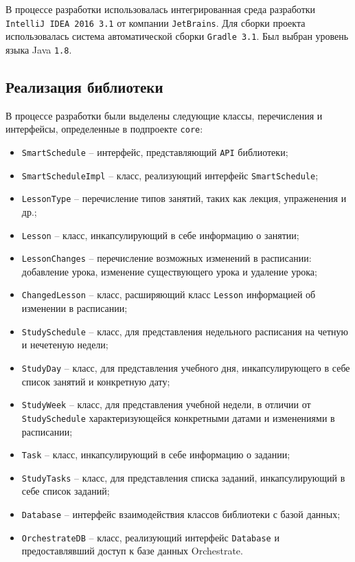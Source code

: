 В процессе разработки использовалась интегрированная среда разработки \texttt{IntelliJ IDEA 2016 3.1} от компании \texttt{JetBrains}. Для сборки проекта использовалась система автоматической сборки \texttt{Gradle 3.1}. Был выбран уровень языка Java \texttt{1.8}.

\subsection{Реализация библиотеки}
В процессе разработки были выделены следующие классы, перечисления и интерфейсы, определенные в подпроекте \texttt{core}:
\begin{itemize}
\item \verb+SmartSchedule+ -- интерфейс, представляющий \texttt{API} библиотеки;
\item \verb+SmartScheduleImpl+ -- класс, реализующий интерфейс \texttt{SmartSchedule};
\item \verb+LessonType+ -- перечисление типов занятий, таких как лекция, упраженения и др.;
\item \verb+Lesson+ -- класс, инкапсулирующий в себе информацию о занятии;
\item \verb+LessonChanges+ -- перечисление возможных изменений в расписании: добавление урока, изменение существующего урока и удаление урока;
\item \verb+ChangedLesson+ -- класс, расширяющий класс \texttt{Lesson} информацией об изменении в расписании;
\item \verb+StudySchedule+ -- класс, для представления недельного расписания на четную и нечетеную недели;
\item \verb+StudyDay+ -- класс, для представления учебного дня, инкапсулирующего в себе список занятий и конкретную дату;
\item \verb+StudyWeek+ -- класс, для представления учебной недели, в отличии от \texttt{StudySchedule} характеризующейся конкретными датами и изменениями в расписании;
\item \verb+Task+ -- класс, инкапсулирующий в себе информацию о задании;
\item \verb+StudyTasks+ -- класс, для представления списка заданий, инкапсулирующий в себе список заданий;
\item \verb+Database+ -- интерфейс взаимодействия классов библиотеки с базой данных;
\item \verb+OrchestrateDB+ -- класс, реализующий интерфейс \texttt{Database} и предоставлявший доступ к базе данных Orchestrate.
\end{itemize}

